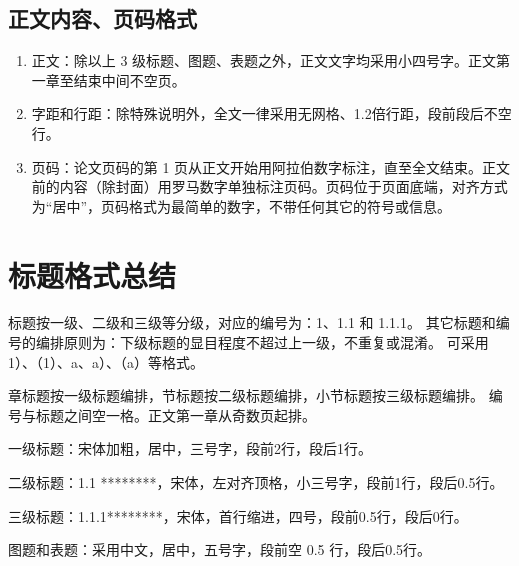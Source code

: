 \subsection{正文内容、页码格式}
\begin{enumerate}
  \item 正文：除以上 3 级标题、图题、表题之外，正文文字均采用小四号字。正文第一章至结束中间不空页。
  \item 字距和行距：除特殊说明外，全文一律采用无网格、1.2倍行距，段前段后不空行。
  \item 页码：论文页码的第 1 页从正文开始用阿拉伯数字标注，直至全文结束。正文前的内容（除封面）用罗马数字单独标注页码。页码位于页面底端，对齐方式为“居中”，页码格式为最简单的数字，不带任何其它的符号或信息。
\end{enumerate}

\section{标题格式总结}

标题按一级、二级和三级等分级，对应的编号为：1、1.1 和 1.1.1。
其它标题和编号的编排原则为：下级标题的显目程度不超过上一级，不重复或混淆。
可采用 1）、（1）、a、a）、（a）等格式。

章标题按一级标题编排，节标题按二级标题编排，小节标题按三级标题编排。
编号与标题之间空一格。正文第一章从奇数页起排。

一级标题：宋体加粗，居中，三号字，段前2行，段后1行。

二级标题：1.1 ********，宋体，左对齐顶格，小三号字，段前1行，段后0.5行。

三级标题：1.1.1********，宋体，首行缩进，四号，段前0.5行，段后0行。

图题和表题：采用中文，居中，五号字，段前空 0.5 行，段后0.5行。
